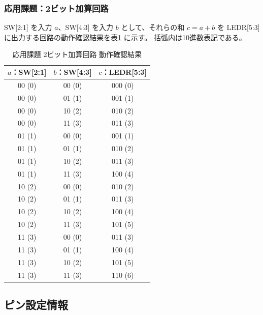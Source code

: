 \documentclass[12pt,a4paper]{ltjsarticle}
\begin{document}
\subsubsection{応用課題：2ビット加算回路}
SW[2:1] を入力 $a$、SW[4:3] を入力 $b$ として、それらの和 $c = a + b$ を LEDR[5:3] に出力する回路の動作確認結果を表\ref{tab:result-adder} に示す。
括弧内は10進数表記である。

\begin{table}[H]
  \centering
  \caption{応用課題 2ビット加算回路 動作確認結果}
  \label{tab:result-adder}
  \begin{tabular}{ccc}
    \toprule
    \textbf{$a$：SW{[2:1]}} &
    \textbf{$b$：SW{[4:3]}} &
    \textbf{$c$：LEDR{[5:3]}} \\
    \midrule
    00 (0) & 00 (0) & 000 (0) \\
    00 (0) & 01 (1) & 001 (1) \\
    00 (0) & 10 (2) & 010 (2) \\
    00 (0) & 11 (3) & 011 (3) \\
    01 (1) & 00 (0) & 001 (1) \\
    01 (1) & 01 (1) & 010 (2) \\
    01 (1) & 10 (2) & 011 (3) \\
    01 (1) & 11 (3) & 100 (4) \\
    10 (2) & 00 (0) & 010 (2) \\
    10 (2) & 01 (1) & 011 (3) \\
    10 (2) & 10 (2) & 100 (4) \\
    10 (2) & 11 (3) & 101 (5) \\
    11 (3) & 00 (0) & 011 (3) \\
    11 (3) & 01 (1) & 100 (4) \\
    11 (3) & 10 (2) & 101 (5) \\
    11 (3) & 11 (3) & 110 (6) \\
    \bottomrule
  \end{tabular}
\end{table}

\subsection{ピン設定情報}\label{subsec:pin-settings}
\end{document}
